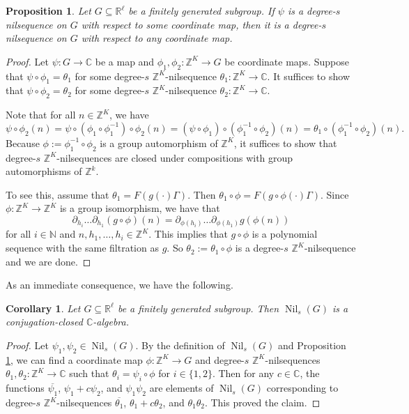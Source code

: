 \documentclass[11pt]{amsart}
\newtheorem{corollary}[lemma]{Corollary}
\newtheorem{proposition}[lemma]{Proposition}
\theoremstyle{definition}
\newcommand{\C}{{\mathbb C}}
\newcommand{\N}{{\mathbb N}}
\newcommand{\R}{{\mathbb R}}
\newcommand{\Z}{{\mathbb Z}}
\newcommand{\1}{{\mathbf{1}}}
\DeclareMathOperator{\Nil}{Nil}
\begin{document}
\begin{proposition}\label{P: same coordinate map}
Let $G\subseteq\R^\ell$ be a finitely generated subgroup. If $\psi$ is a degree-$s$ nilsequence on $G$ with respect to some coordinate map, then it is a degree-$s$ nilsequence on $G$ with respect to any coordinate map.
\end{proposition}
\begin{proof}
    Let $\psi\colon G\to\C$ be a map and $\phi_{1},\phi_{2}\colon\Z^{K}\to G$ be coordinate maps. Suppose that $\psi\circ \phi_{1}=\theta_{1}$ for some degree-$s$ $\Z^{K}$-nilsequence $\theta_{1}\colon\Z^{K}\to \C$. It suffices to show that  $\psi\circ \phi_{2}=\theta_{2}$ for some  degree-$s$ $\Z^{K}$-nilsequence $\theta_{2}\colon\Z^{K}\to \C$.

    Note that for all $n\in \Z^K$, we have
    $$\psi\circ\phi_{2}(n)=\psi\circ(\phi_{1}\circ\phi_{1}^{-1})\circ\phi_{2}(n)=(\psi\circ\phi_{1})\circ(\phi_{1}^{-1}\circ\phi_{2})(n)=\theta_1\circ(\phi_{1}^{-1}\circ\phi_{2})(n).$$
  Because $\phi:=\phi_{1}^{-1}\circ\phi_{2}$ is a group automorphism of $\Z^{K}$, it suffices to show that degree-$s$ $\Z^{K}$-nilsequences are closed under compositions with group automorphisms of $\Z^k$.
    
    To see this, assume that $\theta_1=F(g(\cdot)\Gamma)$. Then $\theta_1\circ \phi=F(g\circ\phi(\cdot)\Gamma)$. Since $\phi:\Z^{K}\to\Z^{K}$ is a group isomorphism, we have that $$\partial_{h_{i}}\dots \partial_{h_{1}}(g\circ \phi)(n)=\partial_{\phi(h_{i})}\dots \partial_{\phi(h_{1})}g(\phi(n))$$ for all $i\in\N$ and $n,h_{1},\dots,h_{i}\in\Z^{K}$. This implies that $g\circ \phi$  is a polynomial sequence with the same filtration as $g$. So $\theta_2:=\theta_1\circ \phi$ is a  degree-$s$ $\Z^{K}$-nilsequence and we are done.
\end{proof}

As an immediate consequence, we have the following.

\begin{corollary}\label{C: algebra}
   Let $G\subseteq\R^\ell$ be a finitely generated subgroup. Then $\Nil_s(G)$ is a conjugation-closed $\C$-algebra.
\end{corollary}
\begin{proof}
    Let $\psi_1, \psi_2\in\Nil_s(G)$. By the definition of $\Nil_s(G)$ and Proposition \ref{P: same coordinate map}, we can find a coordinate map $\phi:\Z^K\to G$ and degree-$s$ $\Z^{K}$-nilsequences $\theta_1, \theta_2\colon \Z^{K}\to \C$ such that $\theta_i=\psi_i\circ \phi$ for $i\in\{1,2\}$. Then for any $c\in\C$, the functions $\overline{\psi_1}$, $\psi_1 + c\psi_2$, and $\psi_1\psi_2$ are elements of $\Nil_s(G)$ corresponding to degree-$s$ $\Z^{K}$-nilsequences $\overline{\theta_1}$, $\theta_1 + c\theta_2$, and $\theta_1\theta_2$. This proved the claim.
\end{proof}
\end{document}
